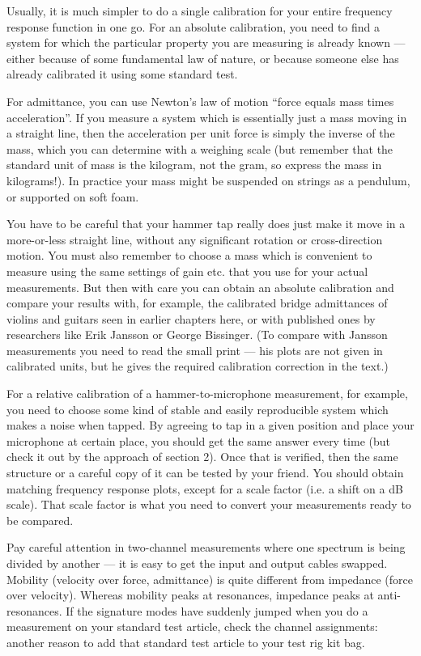   Usually, it is much simpler to do a single calibration for your entire 
  frequency response function in one go. For an absolute calibration, you need 
  to find a system for which the particular property you are measuring is 
  already known — either because of some fundamental law of nature, or because 
  someone else has already calibrated it using some standard test. 

  For admittance, you can use Newton’s law of motion “force equals mass times 
  acceleration”. If you measure a system which is essentially just a mass 
  moving in a straight line, then the acceleration per unit force is simply the 
  inverse of the mass, which you can determine with a weighing scale (but 
  remember that the standard unit of mass is the kilogram, not the gram, so 
  express the mass in kilograms!). In practice your mass might be suspended on 
  strings as a pendulum, or supported on soft foam. 

  You have to be careful that your hammer tap really does just make it move in 
  a more-or-less straight line, without any significant rotation or 
  cross-direction motion. You must also remember to choose a mass which is 
  convenient to measure using the same settings of gain etc. that you use for 
  your actual measurements. But then with care you can obtain an absolute 
  calibration and compare your results with, for example, the calibrated bridge 
  admittances of violins and guitars seen in earlier chapters here, or with 
  published ones by researchers like Erik Jansson or George Bissinger. (To 
  compare with Jansson measurements you need to read the small print — his 
  plots are not given in calibrated units, but he gives the required 
  calibration correction in the text.) 

  For a relative calibration of a hammer-to-microphone measurement, for 
  example, you need to choose some kind of stable and easily reproducible 
  system which makes a noise when tapped. By agreeing to tap in a given 
  position and place your microphone at certain place, you should get the same 
  answer every time (but check it out by the approach of section 2). Once that 
  is verified, then the same structure or a careful copy of it can be tested by 
  your friend. You should obtain matching frequency response plots, except for 
  a scale factor (i.e. a shift on a dB scale). That scale factor is what you 
  need to convert your measurements ready to be compared. 

  Pay careful attention in two-channel measurements where one spectrum is being 
  divided by another — it is easy to get the input and output cables swapped. 
  Mobility (velocity over force, admittance) is quite different from impedance 
  (force over velocity). Whereas mobility peaks at resonances, impedance peaks 
  at anti-resonances. If the signature modes have suddenly jumped when you do a 
  measurement on your standard test article, check the channel assignments: 
  another reason to add that standard test article to your test rig kit bag. 

